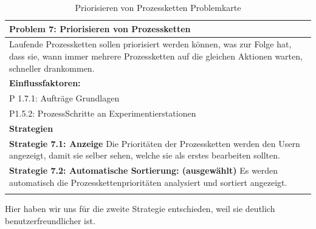 \documentclass[enabledeprecatedfontcommands,fontsize=12pt,paper=a4,twoside]{scrartcl}
\begin{document}
\begin{table}[H]
    \centering
    \begin{tabular}{|p{15cm}|}
    \hline
          \textbf{Problem 7:} Priorisieren von Prozessketten
          \\ \hline
          Laufende Prozessketten sollen priorisiert werden können, was zur Folge hat, dass sie, wann immer mehrere Prozessketten auf die gleichen Aktionen warten, schneller drankommen. 
          \\ \hline
          \textbf{Einflussfaktoren: } \\
          P 1.7.1: Aufträge Grundlagen\\
	P1.5.2: ProzessSchritte an Experimentierstationen \\
          \hline
          \textbf{Strategien} \\ \hline
            {}          
           \label{strategie:7.1}     
          \textbf{Strategie 7.1: Anzeige} Die Prioritäten der Prozessketten werden den Usern angezeigt, damit sie selber sehen, welche sie als erstes bearbeiten sollten. \\
	 \label{strategie:7.2}
          \textbf{Strategie 7.2: Automatische Sortierung: (ausgewählt)} Es werden automatisch die Prozesskettenprioritäten analysiert und sortiert angezeigt. \\
          \\ \hline
    \end{tabular}
    \caption{Priorisieren von Prozessketten Problemkarte}
    \label{tab:ProblemKarte7}
\end{table}
Hier haben wir uns für die zweite Strategie entschieden, weil sie deutlich benutzerfreundlicher ist. \\
\end{document}
